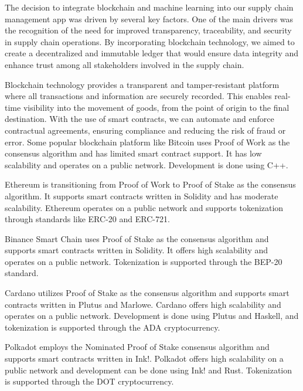 
\noindent The decision to integrate blockchain and machine learning into our supply chain management app was driven by several key factors. One of the main drivers was the recognition of the need for improved transparency, traceability, and security in supply chain operations. By incorporating blockchain technology, we aimed to create a decentralized and immutable ledger that would ensure data integrity and enhance trust among all stakeholders involved in the supply chain.
\par Blockchain technology provides a transparent and tamper-resistant platform where all transactions and information are securely recorded. This enables real-time visibility into the movement of goods, from the point of origin to the final destination. With the use of smart contracts, we can automate and enforce contractual agreements, ensuring compliance and reducing the risk of fraud or error. Some popular blockchain platform like Bitcoin uses Proof of Work as the consensus algorithm and has limited smart contract support. It has low scalability and operates on a public network. Development is done using C++.

Ethereum is transitioning from Proof of Work to Proof of Stake as the consensus algorithm. It supports smart contracts written in Solidity and has moderate scalability. Ethereum operates on a public network and supports tokenization through standards like ERC-20 and ERC-721.

Binance Smart Chain uses Proof of Stake as the consensus algorithm and supports smart contracts written in Solidity. It offers high scalability and operates on a public network. Tokenization is supported through the BEP-20 standard.

Cardano utilizes Proof of Stake as the consensus algorithm and supports smart contracts written in Plutus and Marlowe. Cardano offers high scalability and operates on a public network. Development is done using Plutus and Haskell, and tokenization is supported through the ADA cryptocurrency.

Polkadot employs the Nominated Proof of Stake consensus algorithm and supports smart contracts written in Ink!. Polkadot offers high scalability on a public network and development can be done using Ink! and Rust. Tokenization is supported through the DOT cryptocurrency.

